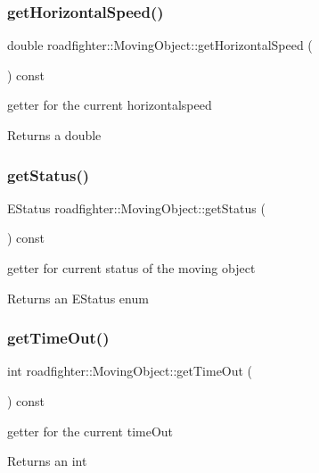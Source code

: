 \subsubsection{\texorpdfstring{get\+Horizontal\+Speed()}{getHorizontalSpeed()}}
{\footnotesize\ttfamily double roadfighter\+::\+Moving\+Object\+::get\+Horizontal\+Speed (\begin{DoxyParamCaption}{ }\end{DoxyParamCaption}) const}

getter for the current horizontalspeed \begin{DoxyReturn}{Returns}
a double 
\end{DoxyReturn}
\mbox{\label{classroadfighter_1_1MovingObject_a05cbcd45fb2827a26f54500a897862b4}} 
\subsubsection{\texorpdfstring{get\+Status()}{getStatus()}}
{\footnotesize\ttfamily E\+Status roadfighter\+::\+Moving\+Object\+::get\+Status (\begin{DoxyParamCaption}{ }\end{DoxyParamCaption}) const}

getter for current status of the moving object \begin{DoxyReturn}{Returns}
an E\+Status enum 
\end{DoxyReturn}
\mbox{\label{classroadfighter_1_1MovingObject_a447e1cfbdca177040016cd25f736d7df}} 
\subsubsection{\texorpdfstring{get\+Time\+Out()}{getTimeOut()}}
{\footnotesize\ttfamily int roadfighter\+::\+Moving\+Object\+::get\+Time\+Out (\begin{DoxyParamCaption}{ }\end{DoxyParamCaption}) const}

getter for the current time\+Out \begin{DoxyReturn}{Returns}
an int 
\end{DoxyReturn}
\mbox{\label{classroadfighter_1_1MovingObject_a299e4d456864595ba066c89f7de58afe}} 
